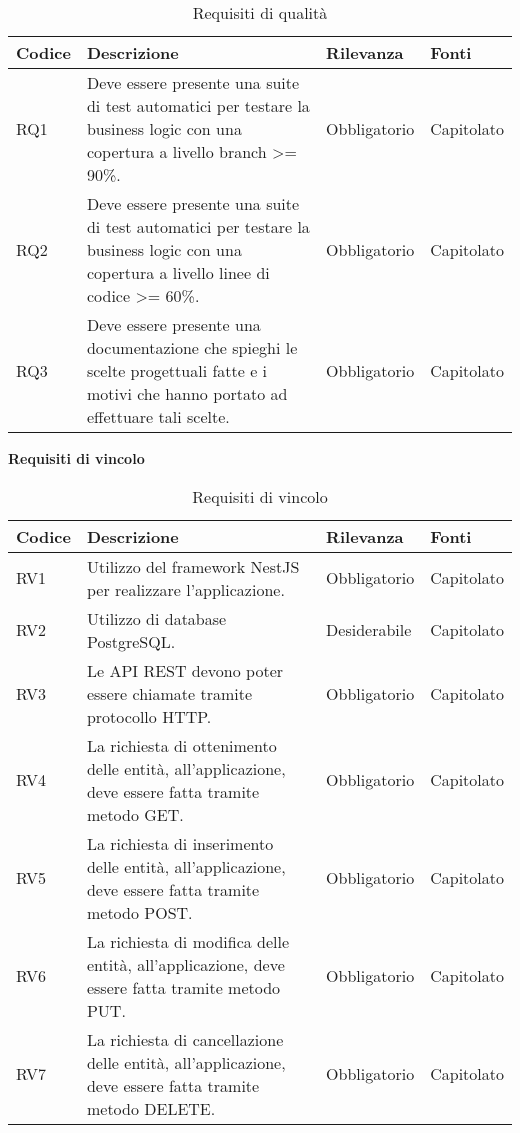 \begin{table}[H]
    \begin{tabular}{|p{1cm}|p{6cm}|p{1.9cm}|p{1.8cm}|} 
    \hline
    Codice & Descrizione & Rilevanza &  Fonti \\ 
    \hline
    RQ1 & Deve essere presente una suite di test automatici per testare la business logic con una copertura a livello branch
        >= 90\%. & Obbligatorio & Capitolato \\ 
    \hline
    RQ2 & Deve essere presente una suite di test automatici per testare la business logic con una copertura a livello linee
        di codice >= 60\%. & Obbligatorio & Capitolato \\ 
    \hline
    RQ3 & Deve essere presente una documentazione che spieghi le scelte progettuali fatte e i motivi che hanno portato ad effettuare
        tali scelte. & Obbligatorio & Capitolato \\ 
    \hline
    \end{tabular}
    \caption{Requisiti di qualità}
\end{table}
\clearpage
\leavevmode\newline
\textbf{Requisiti di vincolo}

\begin{table}[H]
    \begin{tabular}{|p{1cm}|p{6cm}|p{1.9cm}|p{1.8cm}|} 
    \hline
    Codice & Descrizione & Rilevanza &  Fonti \\ 
    \hline
    RV1 & Utilizzo del framework NestJS per realizzare l'applicazione. & Obbligatorio & Capitolato \\ 
    \hline
    RV2 & Utilizzo di database PostgreSQL. & Desiderabile & Capitolato \\ 
    \hline
    RV3 & Le \gls{API} \gls{REST} devono poter essere chiamate tramite protocollo \gls{HTTP}. & Obbligatorio & Capitolato \\ 
    \hline
    RV4 & La richiesta di ottenimento delle entità, all'applicazione, deve essere fatta tramite metodo GET. & 
        Obbligatorio & Capitolato \\ 
    \hline
    RV5 & La richiesta di inserimento delle entità, all'applicazione, deve essere fatta tramite metodo POST. & 
        Obbligatorio & Capitolato \\ 
    \hline
    RV6 & La richiesta di modifica delle entità, all'applicazione, deve essere fatta tramite metodo PUT. & 
        Obbligatorio & Capitolato \\ 
    \hline
    RV7 & La richiesta di cancellazione delle entità, all'applicazione, deve essere fatta tramite metodo DELETE. & 
        Obbligatorio & Capitolato \\ 
    \hline
    \end{tabular}
    \caption{Requisiti di vincolo}
\end{table}